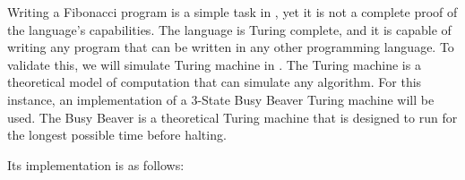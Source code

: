 Writing a Fibonacci program is a simple task in \sculpt, yet it is not a complete proof of the language's capabilities.
The language is Turing complete, and it is capable of writing any program that can be written in any other programming language.
To validate this, we will simulate Turing machine in \sculpt.
The Turing machine is a theoretical model of computation that can simulate any algorithm.
For this instance, an implementation of a 3-State Busy Beaver Turing machine will be used.
The Busy Beaver is a theoretical Turing machine that is designed to run for the longest possible time before halting.


Its \sculpter implementation is as follows:

